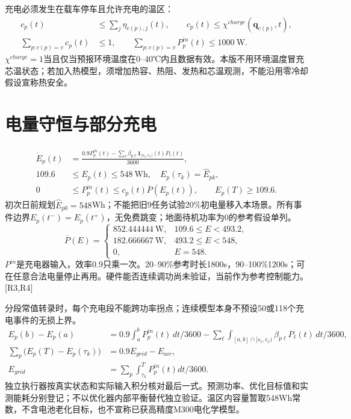 \noindent 充电必须发生在载车停车且允许充电的温区：
\begin{align}
 c_p(t)&\le\sum_j\eta_{c(p),j}(t),\qquad c_p(t)\le\chi^{charge}(\mathbf q_{c(p)},t),\\
 \sum_{p:c(p)=v}c_p(t)&\le1,\qquad
 \sum_{p:c(p)=v}P_p^{in}(t)\le1000\ \mathrm W.
 \label{eng:eq:chargingcapacity}
\end{align}
\noindent $\chi^{charge}=1$当且仅当预报环境温度在0--40℃内且数据有效。本版不用环境温度冒充芯温状态；若加入热模型，须增加热容、热阻、发热和芯温观测，不能沿用零冷却假设宣称热安全。
\clearpage

\section{电量守恒与部分充电}
\begin{align}
 \dot E_p(t)&=\frac{0.9P_p^{in}(t)-\sum_\ell\beta_{p\ell}
                   \mathbf1_{[s_\ell,e_\ell)}(t)P_\ell(t)}{3600},\\
 109.6&\le E_p(t)\le548\ \mathrm{Wh},\quad E_p(\tau_k)=\widehat E_{pk},\\
 0&\le P_p^{in}(t)\le c_p(t)\overline P(E_p(t)),\qquad E_p(T)\ge109.6.
 \label{eng:eq:battery}
\end{align}
\noindent 初次日前规划$\widehat E_{p0}=548$Wh；不能把旧9任务试验20\%初电量移入本场景。所有事件边界$E_p(t^-)=E_p(t^+)$，无免费跳变；地面待机功率为0的参考假设单列。
\begin{equation}
 \overline P(E)=\begin{cases}
 852.444444\ \mathrm W,&109.6\le E<493.2,\\
 182.666667\ \mathrm W,&493.2\le E<548,\\
 0,&E=548.
 \end{cases}
 \label{eng:eq:chargecurve}
\end{equation}
\noindent $P^{in}$是充电器输入，效率0.9只乘一次。20--90\%参考时长1800s，90--100\%1200s；可在任意合法电量停止再用。硬件能否连续调功尚未验证，当前作为参考控制能力。[R3,R4]

\noindent 分段常值转录时，每个充电段不能跨功率拐点；连续模型本身不预设50或118个充电事件的无损上界。
\begin{align}
 E_p(b)-E_p(a)&=0.9\int_a^bP_p^{in}(t)\,dt/3600
              -\sum_\ell\int_{[a,b]\cap[s_\ell,e_\ell)}\beta_{p\ell}P_\ell(t)\,dt/3600,\\
 \sum_p\big(E_p(T)-E_p(\tau_k)\big)&=0.9E_{grid}-E_{air},\label{eng:eq:energyledger}\\
 E_{grid}&=\sum_p\int_{\tau_k}^T P_p^{in}(t)dt/3600.
\end{align}
\noindent 独立执行器按真实状态和实际输入积分核对最后一式。预测功率、优化目标值和实测能耗分别登记；不以优化器内部平衡替代独立验证。温区内容量暂取548Wh常数，不含电池老化目标，也不宣称已获高精度M300电化学模型。
\clearpage

